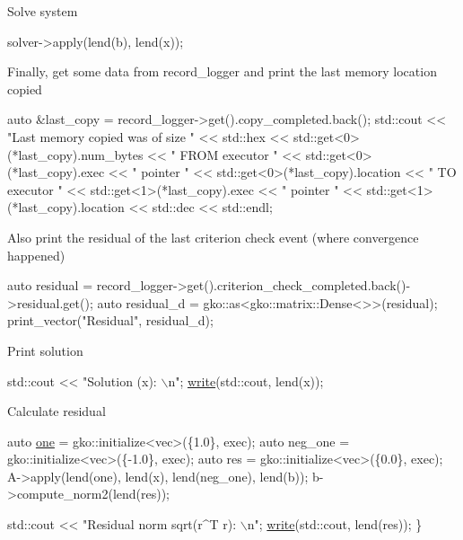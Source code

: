Solve system


\begin{DoxyCode}
solver->apply(lend(b), lend(x));
\end{DoxyCode}


Finally, get some data from {\ttfamily record\+\_\+logger} and print the last memory location copied


\begin{DoxyCode}
\textcolor{keyword}{auto} &last\_copy = record\_logger->get().copy\_completed.back();
std::cout << \textcolor{stringliteral}{"Last memory copied was of size "} << std::hex
          << std::get<0>(*last\_copy).num\_bytes << \textcolor{stringliteral}{" FROM executor "}
          << std::get<0>(*last\_copy).exec << \textcolor{stringliteral}{" pointer "}
          << std::get<0>(*last\_copy).location << \textcolor{stringliteral}{" TO executor "}
          << std::get<1>(*last\_copy).exec << \textcolor{stringliteral}{" pointer "}
          << std::get<1>(*last\_copy).location << std::dec << std::endl;
\end{DoxyCode}


Also print the residual of the last criterion check event (where convergence happened)


\begin{DoxyCode}
\textcolor{keyword}{auto} residual =
    record\_logger->get().criterion\_check\_completed.back()->residual.get();
\textcolor{keyword}{auto} residual\_d = gko::as<gko::matrix::Dense<>>(residual);
print\_vector(\textcolor{stringliteral}{"Residual"}, residual\_d);
\end{DoxyCode}


Print solution


\begin{DoxyCode}
std::cout << \textcolor{stringliteral}{"Solution (x): \(\backslash\)n"};
\hyperlink{namespacegko_a859dc47a462721d83728d91ab7fa2148}{write}(std::cout, lend(x));
\end{DoxyCode}


Calculate residual


\begin{DoxyCode}
    \textcolor{keyword}{auto} \hyperlink{namespacegko_a0059e27f8f4bc348ff65c1e60caf47c8}{one} = gko::initialize<vec>(\{1.0\}, exec);
    \textcolor{keyword}{auto} neg\_one = gko::initialize<vec>(\{-1.0\}, exec);
    \textcolor{keyword}{auto} res = gko::initialize<vec>(\{0.0\}, exec);
    A->apply(lend(one), lend(x), lend(neg\_one), lend(b));
    b->compute\_norm2(lend(res));

    std::cout << \textcolor{stringliteral}{"Residual norm sqrt(r^T r): \(\backslash\)n"};
    \hyperlink{namespacegko_a859dc47a462721d83728d91ab7fa2148}{write}(std::cout, lend(res));
\}
\end{DoxyCode}
 \label{_Results}%
